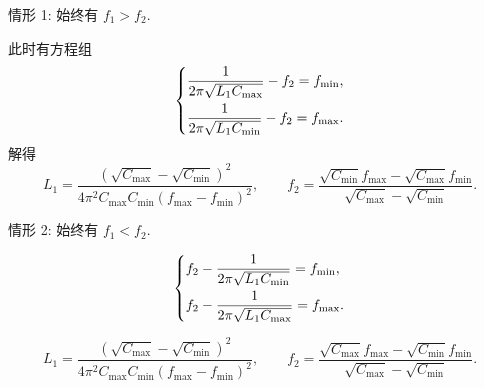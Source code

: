 \documentclass{article}
\begin{document}
情形 1: 始终有 $f_1>f_2$.

此时有方程组
\begin{equation}
	\begin{dcases}
		\frac1{2\pi\sqrt{L_1C_{\mathrm{max}}}}-f_2=f_{\mathrm{min}},\\
		\frac1{2\pi\sqrt{L_1C_{\mathrm{min}}}}-f_2=f_{\mathrm{max}}.
	\end{dcases}
\end{equation}
解得
\begin{equation}
	L_1=\frac{\left(\sqrt{C_{\mathrm{max}}}-\sqrt{C_{\mathrm{min}}}\right)^2}{4\pi^2C_{\mathrm{max}}C_{\mathrm{min}}\left(f_{\mathrm{max}}-f_{\mathrm{min}}\right)^2},\qquad
	f_2=\frac{\sqrt{C_{\mathrm{min}}}f_{\mathrm{max}}-\sqrt{C_{\mathrm{max}}}f_{\mathrm{min}}}{\sqrt{C_{\mathrm{max}}}-\sqrt{C_{\mathrm{min}}}}.
\end{equation}

情形 2: 始终有 $f_1<f_2$.

\begin{equation}
	\begin{dcases}
		f_2-\frac1{2\pi\sqrt{L_1C_{\mathrm{min}}}}=f_{\mathrm{min}},\\
		f_2-\frac1{2\pi\sqrt{L_1C_{\mathrm{max}}}}=f_{\mathrm{max}}.
	\end{dcases}
\end{equation}

\begin{equation}
	L_1=\frac{\left(\sqrt{C_{\mathrm{max}}}-\sqrt{C_{\mathrm{min}}}\right)^2}{4\pi^2C_{\mathrm{max}}C_{\mathrm{min}}\left(f_{\mathrm{max}}-f_{\mathrm{min}}\right)^2},\qquad
	f_2=\frac{\sqrt{C_{\mathrm{max}}}f_{\mathrm{max}}-\sqrt{C_{\mathrm{min}}}f_{\mathrm{min}}}{\sqrt{C_{\mathrm{max}}}-\sqrt{C_{\mathrm{min}}}}.
\end{equation}
\end{document}
